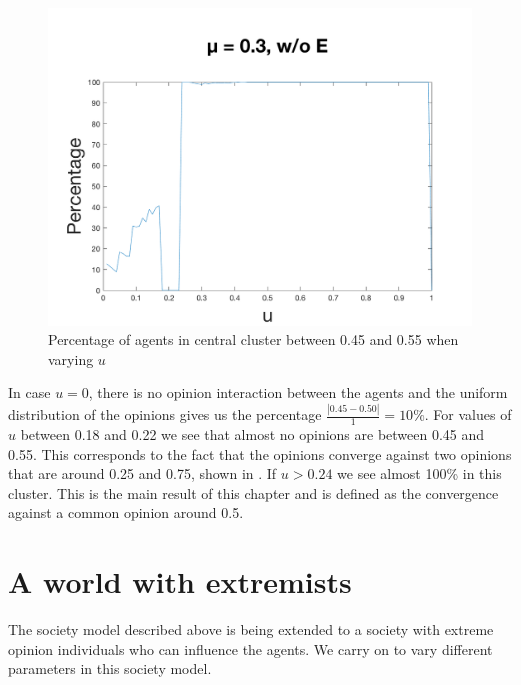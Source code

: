 \documentclass[11pt]{article}
\begin{document}
\begin{figure}[!htb]
\center
  \includegraphics[width=0.7\linewidth]{gen_plot_intervall_2017121816214390840e+01.png}
  \caption{Percentage of agents in central cluster between 0.45 and 0.55 when varying $u$}
  \label{fig:uwithoutextremists}
\end{figure}

In case $u = 0$, there is no opinion interaction between the agents and the uniform distribution of the opinions gives us the percentage $\frac{|0.45-0.50|}{1} = 10\%$. For values of $u$ between 0.18 and 0.22 we see that almost no opinions are between 0.45 and 0.55. This corresponds to the fact that the opinions converge against two opinions that are around 0.25 and 0.75, shown in \cite{Minor}. If $u > 0.24$ we see almost 100\% in this cluster. This is the main result of this chapter and is defined as the convergence against a common opinion around 0.5.

\section{A world with extremists}
The society model described above is being extended to a society with extreme opinion individuals who can influence the agents. We carry on to vary different parameters in this society model.
\end{document}

